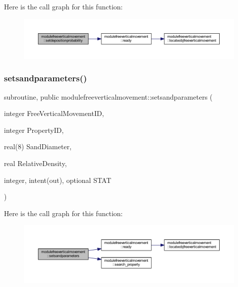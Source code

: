 Here is the call graph for this function\+:\nopagebreak
\begin{figure}[H]
\begin{center}
\leavevmode
\includegraphics[width=350pt]{namespacemodulefreeverticalmovement_af516e84df0a0267e1305aeeba0e3d131_cgraph}
\end{center}
\end{figure}
\mbox{\label{namespacemodulefreeverticalmovement_a9259d59598e55228b4b8a0ac729e3373}} 
\subsubsection{\texorpdfstring{setsandparameters()}{setsandparameters()}}
{\footnotesize\ttfamily subroutine, public modulefreeverticalmovement\+::setsandparameters (\begin{DoxyParamCaption}\item[{integer}]{Free\+Vertical\+Movement\+ID,  }\item[{integer}]{Property\+ID,  }\item[{real(8)}]{Sand\+Diameter,  }\item[{real}]{Relative\+Density,  }\item[{integer, intent(out), optional}]{S\+T\+AT }\end{DoxyParamCaption})}

Here is the call graph for this function\+:\nopagebreak
\begin{figure}[H]
\begin{center}
\leavevmode
\includegraphics[width=350pt]{namespacemodulefreeverticalmovement_a9259d59598e55228b4b8a0ac729e3373_cgraph}
\end{center}
\end{figure}
\mbox{\label{namespacemodulefreeverticalmovement_a09fc990d2d2ac27c1577ca26d525281a}} 
